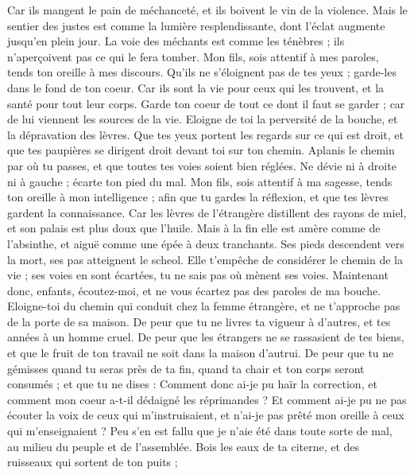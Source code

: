 \begin{multicols}{2}
Car ils mangent le pain de méchanceté, et ils boivent le vin de la violence.
Mais le sentier des justes est comme la lumière resplendissante, dont l’éclat augmente jusqu'en plein jour.
La voie des méchants est comme les ténèbres ; ils n’aperçoivent pas ce qui le fera tomber.
Mon fils, sois attentif à mes paroles, tends ton oreille à mes discours.
Qu'ils ne s'éloignent pas de tes yeux ; garde-les dans le fond de ton coeur.
Car ils sont la vie pour ceux qui les trouvent, et la santé pour tout leur corps.
Garde ton coeur de tout ce dont il faut se garder ; car de lui viennent les sources de la vie.
Eloigne de toi la perversité de la bouche, et la dépravation des lèvres.
Que tes yeux portent les regards sur ce qui est droit, et que tes paupières se dirigent droit devant toi sur ton chemin.
Aplanis le chemin par où tu passes, et que toutes tes voies soient bien réglées.
Ne dévie ni à droite ni à gauche ; écarte ton pied du mal.
\VerseOne{}Mon fils, sois attentif à ma sagesse, tends ton oreille à mon intelligence ;
afin que tu gardes la réflexion, et que tes lèvres gardent la connaissance.
Car les lèvres de l'étrangère distillent des rayons de miel, et son palais est plus doux que l'huile.
Mais à la fin elle est amère comme de l'absinthe, et aiguë comme une épée à deux tranchants.
Ses pieds descendent vers la mort, ses pas atteignent le scheol.
Elle t’empêche de considérer le chemin de la vie ; ses voies en sont écartées, tu ne sais pas où mènent ses voies.
Maintenant donc, enfants, écoutez-moi, et ne vous écartez pas des paroles de ma bouche.
Eloigne-toi du chemin qui conduit chez la femme étrangère, et ne t'approche pas de la porte de sa maison.
De peur que tu ne livres ta vigueur à d'autres, et tes années à un homme cruel.
De peur que les étrangers ne se rassasient de tes biens, et que le fruit de ton travail ne soit dans la maison d’autrui.
De peur que tu ne gémisses quand tu seras près de ta fin, quand ta chair et ton corps seront consumés ;
et que tu ne dises : Comment donc ai-je pu haïr la correction, et comment mon coeur a-t-il dédaigné les réprimandes ?
Et comment ai-je pu ne pas écouter la voix de ceux qui m'instruisaient, et n'ai-je pas prêté mon oreille à ceux qui m'enseignaient ?
Peu s'en est fallu que je n'aie été dans toute sorte de mal, au milieu du peuple et de l'assemblée.
Bois les eaux de ta citerne, et des ruisseaux qui sortent de ton puits ;

\end{multicols}
